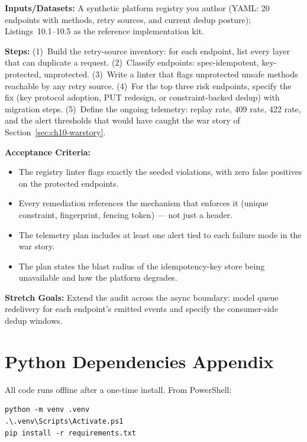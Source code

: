 \textbf{Inputs/Datasets:} A synthetic platform registry you author (YAML: 20
endpoints with methods, retry sources, and current dedup posture);
Listings~10.1--10.5 as the reference implementation kit.

\textbf{Steps:} (1)~Build the retry-source inventory: for each endpoint,
list every layer that can duplicate a request. (2)~Classify endpoints:
spec-idempotent, key-protected, unprotected. (3)~Write a linter that flags
unprotected unsafe methods reachable by any retry source. (4)~For the top
three risk endpoints, specify the fix (key protocol adoption, PUT
redesign, or constraint-backed dedup) with migration steps. (5)~Define the
ongoing telemetry: replay rate, 409 rate, 422 rate, and the alert
thresholds that would have caught the war story of
Section~\ref{sec:ch10-warstory}.

\textbf{Acceptance Criteria:}
\begin{itemize}
  \item[$\square$] The registry linter flags exactly the seeded violations,
        with zero false positives on the protected endpoints.
  \item[$\square$] Every remediation references the mechanism that enforces
        it (unique constraint, fingerprint, fencing token) --- not just a
        header.
  \item[$\square$] The telemetry plan includes at least one alert tied to
        each failure mode in the war story.
  \item[$\square$] The plan states the blast radius of the idempotency-key
        store being unavailable and how the platform degrades.
\end{itemize}

\textbf{Stretch Goals:} Extend the audit across the async boundary: model
queue redelivery for each endpoint's emitted events and specify the
consumer-side dedup windows.

\section{Python Dependencies Appendix}
\label{sec:ch10-deps}

All code runs offline after a one-time install. From PowerShell:

\begin{verbatim}
python -m venv .venv
.\.venv\Scripts\Activate.ps1
pip install -r requirements.txt
\end{verbatim}

